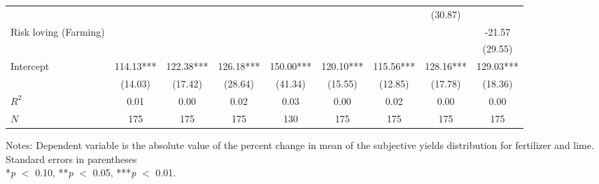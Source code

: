 \begin{table}[htbp]
\begin{threeparttable}
\begin{tabular}{l cccccccc}
                    &               &               &               &               &               &               &     (30.87)   &               \\
Risk loving (Farming)&               &               &               &               &               &               &               &      -21.57   \\
                    &               &               &               &               &               &               &               &     (29.55)   \\
Intercept           &      114.13***&      122.38***&      126.18***&      150.00***&      120.10***&      115.56***&      128.16***&      129.03***\\
                    &     (14.03)   &     (17.42)   &     (28.64)   &     (41.34)   &     (15.55)   &     (12.85)   &     (17.78)   &     (18.36)   \\
\hline
$R^2$               &        0.01   &        0.00   &        0.02   &        0.03   &        0.00   &        0.02   &        0.00   &        0.00   \\
$N$                 &         175   &         175   &         175   &         130   &         175   &         175   &         175   &         175   \\
\hline
\hline
\end{tabular}
\begin{tablenotes}
\footnotesize
\item{Notes: Dependent variable is the absolute value of the percent change in mean of the subjective yields distribution for fertilizer and lime. \\ Standard errors in parentheses \\ *\textit{p} $<$ 0.10, **\textit{p} $<$ 0.05, ***\textit{p} $<$ 0.01.}
\end{tablenotes}
\end{threeparttable}
\end{table}
